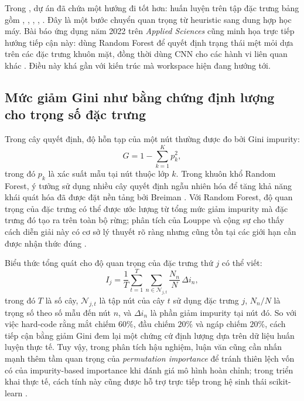\documentclass[12pt,a4paper]{article}
\begin{document}
Trong , dự án đã chứa một hướng đi tốt hơn: huấn luyện  trên tập đặc trưng bảng gồm , , , , . Đây là một bước chuyển quan trọng từ heuristic sang dung hợp học máy. Bài báo ứng dụng năm 2022 trên \textit{Applied Sciences} cũng minh họa trực tiếp hướng tiếp cận này: dùng Random Forest để quyết định trạng thái mệt mỏi dựa trên các đặc trưng khuôn mặt, đồng thời dùng CNN cho các hành vi liên quan khác \cite{dong2022}. Điều này khá gần với kiến trúc mà workspace hiện đang hướng tới.

\subsection{Mức giảm Gini như bằng chứng định lượng cho trọng số đặc trưng}
Trong cây quyết định, độ hỗn tạp của một nút thường được đo bởi Gini impurity:
\[
G = 1 - \sum_{k=1}^{K} p_k^2,
\]
trong đó \(p_k\) là xác suất mẫu tại nút thuộc lớp \(k\). Trong khuôn khổ Random Forest, ý tưởng sử dụng nhiều cây quyết định ngẫu nhiên hóa để tăng khả năng khái quát hóa đã được đặt nền tảng bởi Breiman \cite{breiman2001}. Với Random Forest, độ quan trọng của đặc trưng có thể được ước lượng từ tổng mức giảm impurity mà đặc trưng đó tạo ra trên toàn bộ rừng; phân tích của Louppe và cộng sự cho thấy cách diễn giải này có cơ sở lý thuyết rõ ràng nhưng cũng tồn tại các giới hạn cần được nhận thức đúng \cite{louppe2013}.

Biểu thức tổng quát cho độ quan trọng của đặc trưng thứ \(j\) có thể viết:
\[
I_j = \frac{1}{T}\sum_{t=1}^{T}\sum_{n \in \mathcal{N}_{j,t}} \frac{N_n}{N}\,\Delta i_n,
\]
trong đó \(T\) là số cây, \(\mathcal{N}_{j,t}\) là tập nút của cây \(t\) sử dụng đặc trưng \(j\), \(N_n/N\) là trọng số theo số mẫu đến nút \(n\), và \(\Delta i_n\) là phần giảm impurity tại nút đó. So với việc hard-code rằng mắt chiếm \(60\%\), đầu chiếm \(20\%\) và ngáp chiếm \(20\%\), cách tiếp cận bằng giảm Gini đem lại một chứng cứ định lượng dựa trên dữ liệu huấn luyện thực tế. Tuy vậy, trong phân tích hậu nghiệm, luận văn cũng cần nhấn mạnh thêm tầm quan trọng của \textit{permutation importance} để tránh thiên lệch vốn có của impurity-based importance khi đánh giá mô hình hoàn chỉnh; trong triển khai thực tế, cách tính này cũng được hỗ trợ trực tiếp trong hệ sinh thái scikit-learn \cite{sklearnperm}.
\end{document}
